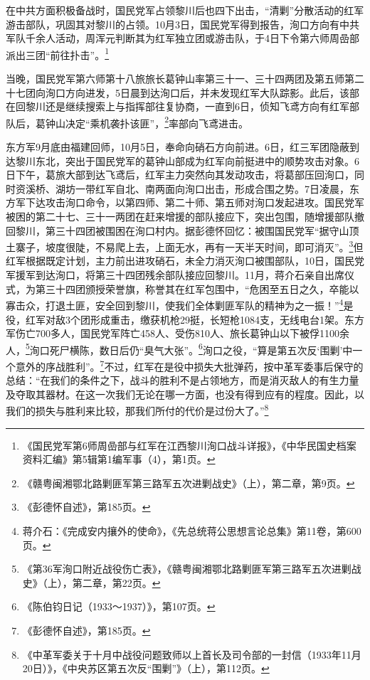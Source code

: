 在中共方面积极备战时，国民党军占领黎川后也四下出击，“清剿”分散活动的红军游击部队，巩固其对黎川的占领。10月3日，国民党军得到报告，洵口方向有中共军队千余人活动，周浑元判断其为红军独立团或游击队，于4日下令第六师周嵒部派出三团“前往扑击”。\footnote{《国民党军第6师周嵒部与红军在江西黎川洵口战斗详报》，《中华民国史档案资料汇编》第5辑第1编军事（4），第1页。}


当晚，国民党军第六师第十八旅旅长葛钟山率第三十一、三十四两团及第五师第二十七团向洵口方向进发，5日晨到达洵口后，并未发现红军大队踪影。此后，该部在回黎川还是继续搜索上与指挥部往复协商，一直到6日，侦知飞鸢方向有红军部队后，葛钟山决定“乘机袭扑该匪”，\footnote{《赣粤闽湘鄂北路剿匪军第三路军五次进剿战史》（上），第二章，第9页。}率部向飞鸢进击。


东方军9月底由福建回师，10月5日，奉命向硝石方向前进。6日，红三军团隐蔽到达黎川东北，突出于国民党军的葛钟山部成为红军向前挺进中的顺势攻击对象。6日下午，葛旅大部到达飞鸢后，红军主力突然向其发动攻击，将葛部压回洵口，同时资溪桥、湖坊一带红军自北、南两面向洵口出击，形成合围之势。7日凌晨，东方军下达攻击洵口命令，以第四师、第二十师、第五师对洵口发起进攻。国民党军被困的第二十七、三十一两团在赶来增援的部队接应下，突出包围，随增援部队撤回黎川，第三十四团被围困在洵口村内。据彭德怀回忆：被围国民党军“据守山顶土寨子，坡度很陡，不易爬上去，上面无水，再有一天半天时间，即可消灭”。\footnote{《彭德怀自述》，第185页。}但红军根据既定计划，主力前出进攻硝石，未全力消灭洵口被围部队，10日，国民党军援军到达洵口，将第三十四团残余部队接应回黎川。11月，蒋介石亲自出席仪式，为第三十四团颁授荣誉旗，称誉其在红军包围中，“危困至五日之久，卒能以寡击众，打退土匪，安全回到黎川，使我们全体剿匪军队的精神为之一振！”\footnote{蒋介石：《完成安内攘外的使命》，《先总统蒋公思想言论总集》第11卷，第600页。}是役，红军对敌3个团形成重击，缴获机枪29挺，长短枪1084支，无线电台1架。东方军伤亡700多人，国民党军阵亡458人、受伤810人、旅长葛钟山以下被俘1100余人，\footnote{《第36军洵口附近战役伤亡表》，《赣粤闽湘鄂北路剿匪军第三路军五次进剿战史》（上），第二章，第22页。}洵口死尸横陈，数日后仍“臭气大张”。\footnote{《陈伯钧日记（1933～1937）》，第107页。}洵口之役，“算是第五次反‘围剿’中一个意外的序战胜利”。\footnote{《彭德怀自述》，第185页。}不过，红军在是役中损失大批弹药，按中革军委事后保守的总结：“在我们的条件之下，战斗的胜利不是占领地方，而是消灭敌人的有生力量及夺取其器材。在这一次我们无论在哪一方面，也没有得到应有的程度。因此，以我们的损失与胜利来比较，那我们所付的代价是过份大了。”\footnote{《中革军委关于十月中战役问题致师以上首长及司令部的一封信（1933年11月20日）》，《中央苏区第五次反“围剿”》（上），第112页。}


